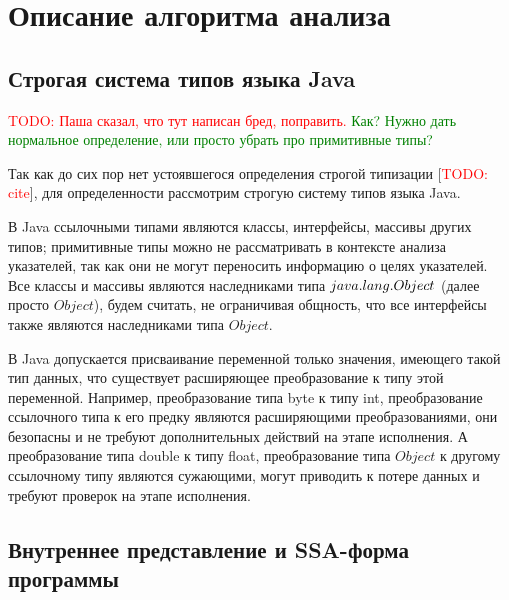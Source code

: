 \documentclass[14pt,titlepage]{extarticle}
\newcommand{\remark}[1]{\textcolor{Green}{#1}}
\newcommand{\todo}[1]{\textcolor{red}{TODO: #1}}
\newcommand{\todocite}{[\todo{cite}]}
\begin{document}
  \newpage
  \section{Описание алгоритма анализа}
    \label{section:algorithm}

    \subsection{Строгая система типов языка Java}
    \label{section:type_system}

      \todo{Паша сказал, что тут написан бред, поправить.}
      \remark{Как? Нужно дать нормальное определение, или просто убрать
      про примитивные типы?}

      Так как до сих пор нет устоявшегося определения строгой типизации
      \todocite, для определенности рассмотрим строгую систему типов языка
      Java.

      В Java ссылочными типами являются классы, интерфейсы, массивы других
      типов; примитивные типы можно не рассматривать в контексте анализа
      указателей, так как они не могут переносить информацию о целях
      указателей. Все классы и массивы являются наследниками типа
      $java\-.lang\-.Object$ (далее просто $Object$), будем считать,
      не ограничивая общность, что все интерфейсы также являются
      наследниками типа $Object$.

      В Java допускается присваивание переменной только значения, имеющего
      такой тип данных, что существует расширяющее преобразование к типу этой
      переменной.
      Например, преобразование типа byte к типу int, преобразование ссылочного
      типа к его предку являются расширяющими преобразованиями, они безопасны и
      не требуют дополнительных действий на этапе исполнения.
      А преобразование типа double к типу float, преобразование типа $Object$ к
      другому ссылочному типу являются сужающими, могут приводить к потере
      данных и требуют проверок на этапе исполнения.

    \subsection{Внутреннее представление и SSA-форма программы}
      \label{section:ir_and_ssa}
\end{document}
